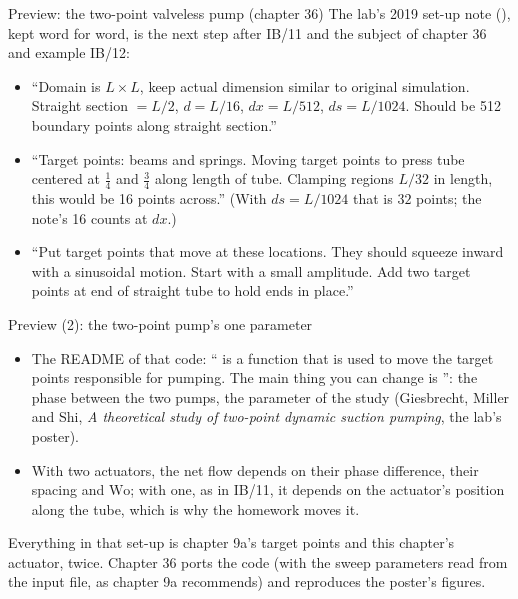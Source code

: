 \documentclass[aspectratio=169,11pt]{beamer}
\begin{document}
\begin{frame}{Preview: the two-point valveless pump (chapter 36)}
\label{fr:twopoint}
\small The lab's 2019 set-up note (), kept word for word, is the next step after IB/11 and the subject of chapter 36 and example IB/12:
\begin{itemize}
  \item ``Domain is $L\times L$, keep actual dimension similar to original simulation. Straight section $= L/2$, $d = L/16$, $dx = L/512$, $ds = L/1024$. Should be 512 boundary points along straight section.''
  \item ``Target points: beams and springs. Moving target points to press tube centered at $\tfrac14$ and $\tfrac34$ along length of tube. Clamping regions $L/32$ in length, this would be 16 points across.'' (With $ds = L/1024$ that is $32$ points; the note's 16 counts at $dx$.)
  \item ``Put target points that move at these locations. They should squeeze inward with a sinusoidal motion. Start with a small amplitude. Add two target points at end of straight tube to hold ends in place.''
\end{itemize}
\end{frame}

\begin{frame}{Preview (2): the two-point pump's one parameter}
\label{fr:twopoint2}
\small
\begin{itemize}
  \item The README of that code: `` is a function that is used to move the target points responsible for pumping. The main thing you can change is '': the phase between the two pumps, the parameter of the study (Giesbrecht, Miller and Shi, \emph{A theoretical study of two-point dynamic suction pumping}, the lab's poster).
  \item With two actuators, the net flow depends on their phase difference, their spacing and $\mathrm{Wo}$; with one, as in IB/11, it depends on the actuator's position along the tube, which is why the homework moves it.
\end{itemize}
\vspace{1mm}
\begin{punchbox}
\small Everything in that set-up is chapter 9a's target points and this chapter's actuator, twice. Chapter 36 ports the code (with the sweep parameters read from the input file, as chapter 9a recommends) and reproduces the poster's figures.
\end{punchbox}
\end{frame}
\end{document}
